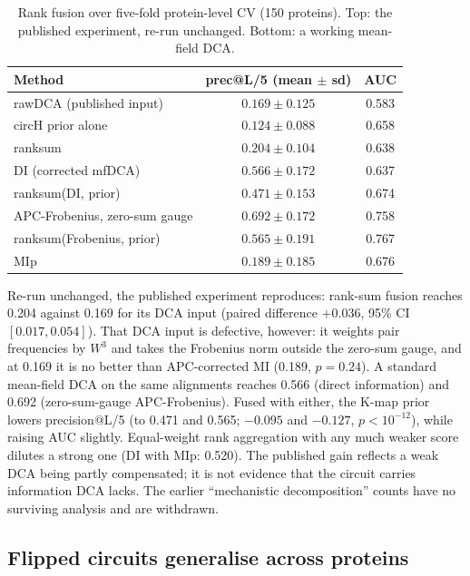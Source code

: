 \begin{table}[ht]
	\centering
	\caption{Rank fusion over five-fold protein-level CV (150 proteins).  Top:
		the published experiment, re-run unchanged.  Bottom: a working mean-field DCA.}
	\label{tab:fusion}
	\begin{tabular}{lcc}
		\toprule
		Method                          & prec@L/5 (mean $\pm$ sd)   & AUC   \\
		\midrule
		rawDCA (published input)        & $0.169 \pm 0.125$          & 0.583 \\
		circH prior alone               & $0.124 \pm 0.088$          & 0.658 \\
		ranksum                         & $0.204 \pm 0.104$          & 0.638 \\
		\midrule
		DI (corrected mfDCA)            & $0.566 \pm 0.172$          & 0.637 \\
		\quad ranksum(DI, prior)        & $0.471 \pm 0.153$          & 0.674 \\
		APC-Frobenius, zero-sum gauge   & $\mathbf{0.692 \pm 0.172}$ & 0.758 \\
		\quad ranksum(Frobenius, prior) & $0.565 \pm 0.191$          & 0.767 \\
		MIp                             & $0.189 \pm 0.185$          & 0.676 \\
		\bottomrule
	\end{tabular}
\end{table}

Re-run unchanged, the published experiment reproduces: rank-sum fusion
reaches 0.204 against 0.169 for its DCA input (paired difference $+0.036$,
95\% CI $[0.017, 0.054]$).  That DCA input is defective, however: it weights
pair frequencies by $W^3$ and takes the Frobenius norm outside the zero-sum
gauge, and at 0.169 it is no better than APC-corrected MI (0.189, $p = 0.24$).
A standard mean-field DCA on the same alignments reaches 0.566 (direct
information) and 0.692 (zero-sum-gauge APC-Frobenius).  Fused with either, the
K-map prior lowers precision@L/5 (to 0.471 and 0.565; $-0.095$ and $-0.127$,
$p < 10^{-12}$), while raising AUC slightly.  Equal-weight rank aggregation
with any much weaker score dilutes a strong one (DI with MIp: 0.520).  The
published gain reflects a weak DCA being partly compensated; it is not
evidence that the circuit carries information DCA lacks.  The earlier
``mechanistic decomposition'' counts have no surviving analysis and are
withdrawn.

\subsection{Flipped circuits generalise across proteins}
\label{sec:res-flipped}


